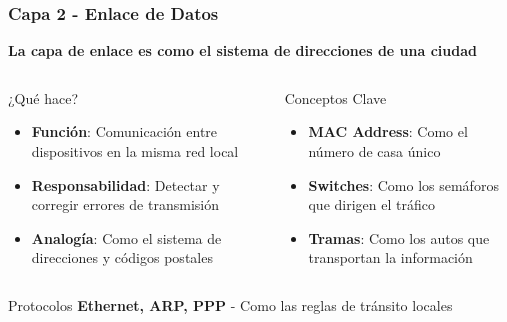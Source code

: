 \documentclass[aspectratio=169]{beamer}
\begin{document}
            \begin{frame}
            \frametitle{Capa 2 - Enlace de Datos}
            
            \begin{center}
            \Large \textbf{La capa de enlace es como el sistema de direcciones de una ciudad}
            \end{center}
            
            \begin{columns}
            \begin{block}{¿Qué hace?}
            \begin{itemize}
            \item \textbf{Función}: Comunicación entre dispositivos en la misma red local
            \item \textbf{Responsabilidad}: Detectar y corregir errores de transmisión
            \item \textbf{Analogía}: Como el sistema de direcciones y códigos postales
            \end{itemize}
            \end{block}
            
            \begin{block}{Conceptos Clave}
            \begin{itemize}
            \item \textbf{MAC Address}: Como el número de casa único
            \item \textbf{Switches}: Como los semáforos que dirigen el tráfico
            \item \textbf{Tramas}: Como los autos que transportan la información
            \end{itemize}
            \end{block}
            
            \end{columns}
            
            \begin{block}{Protocolos}
            \textbf{Ethernet, ARP, PPP} - Como las reglas de tránsito locales
            \end{block}
            \end{frame}
            
\end{document}
